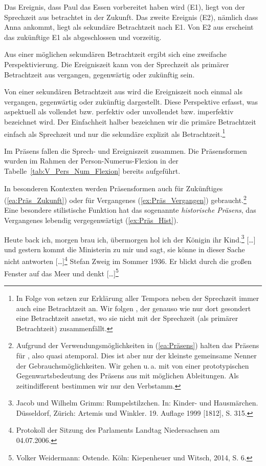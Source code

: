 Das Ereignis, dass Paul das Essen vorbereitet haben wird (E1), liegt von der Sprechzeit aus betrachtet in der Zukunft. Das zweite Ereignis (E2), nämlich dass Anna ankommt, liegt als sekundäre Betrachtzeit nach E1. Von E2 aus erscheint das zukünftige E1 als abgeschlossen und vorzeitig. 

Aus einer möglichen sekundären Betrachtzeit ergibt sich eine zweifache Perspektivierung. Die Ereigniszeit kann von der Sprechzeit als primärer Betrachtzeit aus vergangen, gegenwärtig oder zukünftig sein. 

Von einer sekundären Betrachtzeit aus wird die Ereigniszeit noch einmal als vergangen, gegenwärtig oder zukünftig dargestellt. Diese Perspektive erfasst, was aspektuell als vollendet bzw. perfektiv oder unvollendet bzw. imperfektiv bezeichnet wird. Der Einfachheit halber bezeichnen wir die primäre Betrachtzeit einfach als Sprechzeit und nur die sekundäre explizit als Betrachtzeit.\footnote{In Folge von \citet{Reichenbach1947} setzen \citet[128]{HelbigBuscha} zur Erklärung aller Tempora neben der Sprechzeit immer auch eine Betrachtzeit an. Wir folgen \citet[22]{Welke2005Temp}, der genauso wie \citet[113]{Eisenberg2020_Satz} nur dort gesondert eine Betrachtzeit ansetzt, wo sie nicht mit der Sprechzeit (als primärer Betrachtzeit) zusammenfällt.}

\label{subsubsubsection:Präsens}

Im Präsens fallen die Sprech- und Ereigniszeit zusammen. Die Präsensformen wurden im Rahmen der Person-Numerus-Flexion in der Tabelle~\ref{tab:V_Pers_Num_Flexion} bereits aufgeführt. 

In besonderen Kontexten werden Präsensformen auch für Zukünftiges (\ref{ea:Präs_Zukunft}) oder für Vergangenes (\ref{ex:Präs_Vergangen}) gebraucht.\footnote{Aufgrund der Verwendungsmöglichkeiten in (\ref{ea:Präsens}) halten \citet[509]{HeidolphFlaemigMotsch1981} das Präsens für , also quasi atemporal. Dies ist aber nur der kleinste gemeinsame Nenner der Gebrauchsmöglichkeiten. Wir gehen u.\,a. mit \citet[153--156]{Welke2005Temp} von einer prototypischen Gegenwartsbedeutung des Präsens aus mit möglichen Ableitungen. Als zeitindifferent bestimmen wir nur den Verbstamm.} Eine besondere stilistische Funktion hat das sogenannte \textit{historische Präsens}, das Vergangenes lebendig vergegenwärtigt (\ref{ex:Präs_Hist}).

\ea \label{ea:Präsens}
\ea \label{ea:Präs_Zukunft} Heute back ich, morgen brau ich, übermorgen hol ich der Königin ihr Kind.\footnote{Jacob und Wilhelm Grimm: Rumpelstilzchen. In: Kinder- und Hausmärchen. Düsseldorf, Zürich: Artemis und Winkler. 19. Auflage 1999 [1812], S. 315.}
\ex \label{ex:Präs_Vergangen} [\ldots{}] und gestern kommt die Ministerin zu mir und sagt, sie könne in dieser Sache nicht antworten [\ldots{}]\footnote{Protokoll der Sitzung des Parlaments Landtag Niedersachsen am 04.07.2006.}
\ex \label{ex:Präs_Hist} Stefan Zweig im Sommer 1936. Er blickt durch die großen Fenster auf das Meer und denkt [\ldots{}]\footnote{Volker Weidermann: Ostende. Köln: Kiepenheuer und Witsch, 2014, S. 6.}
\z 
\z 

